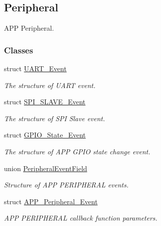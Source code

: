 \hypertarget{group___a_p_p___p_e_r_i_p_h_e_r_a_l}{}\subsection{Peripheral}
\label{group___a_p_p___p_e_r_i_p_h_e_r_a_l}


A\+PP Peripheral.  


\subsubsection*{Classes}
\begin{DoxyCompactItemize}
\item 
struct \hyperlink{struct_u_a_r_t___event}{U\+A\+R\+T\+\_\+\+Event}
\begin{DoxyCompactList}\small\item\em The structure of U\+A\+RT event. \end{DoxyCompactList}\item 
struct \hyperlink{struct_s_p_i___s_l_a_v_e___event}{S\+P\+I\+\_\+\+S\+L\+A\+V\+E\+\_\+\+Event}
\begin{DoxyCompactList}\small\item\em The structure of S\+PI Slave event. \end{DoxyCompactList}\item 
struct \hyperlink{struct_g_p_i_o___state___event}{G\+P\+I\+O\+\_\+\+State\+\_\+\+Event}
\begin{DoxyCompactList}\small\item\em The structure of A\+PP G\+P\+IO state change event. \end{DoxyCompactList}\item 
union \hyperlink{union_peripheral_event_field}{Peripheral\+Event\+Field}
\begin{DoxyCompactList}\small\item\em Structure of A\+PP P\+E\+R\+I\+P\+H\+E\+R\+AL events. \end{DoxyCompactList}\item 
struct \hyperlink{struct_a_p_p___peripheral___event}{A\+P\+P\+\_\+\+Peripheral\+\_\+\+Event}
\begin{DoxyCompactList}\small\item\em A\+PP P\+E\+R\+I\+P\+H\+E\+R\+AL callback function parameters. \end{DoxyCompactList}\end{DoxyCompactItemize}
